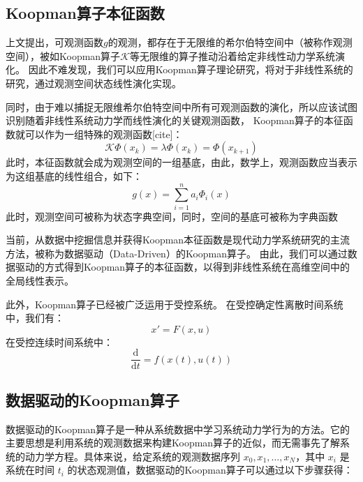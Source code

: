 \documentclass[AutoFakeBold]{LZUThesis}
\begin{document}

\subsection{Koopman算子本征函数}
上文提出，可观测函数$g$的观测，都存在于无限维的希尔伯特空间中（被称作观测空间），被如Koopman算子$\mathcal{K}$等无限维的算子推动沿着给定非线性动力学系统演化。
因此不难发现，我们可以应用Koopman算子理论研究，将对于非线性系统的研究，通过观测空间状态线性演化实现。

同时，由于难以捕捉无限维希尔伯特空间中所有可观测函数的演化，所以应该试图识别随着非线性系统动力学而线性演化的关键观测函数，
Koopman算子的本征函数就可以作为一组特殊的观测函数[cite]：
\begin{equation}
  \mathcal{K} \Phi (x_k) = \lambda \Phi(x_k) = \Phi(x_{k + 1})
\end{equation}
此时，本征函数就会成为观测空间的一组基底，由此，数学上，观测函数应当表示为这组基底的线性组合，如下：
\begin{equation}
  g(x) = \sum_{i = 1}^n a_i \Phi_i(x)
\end{equation}
此时，观测空间可被称为状态字典空间，同时，空间的基底可被称为字典函数

当前，从数据中挖掘信息并获得Koopman本征函数是现代动力学系统研究的主流方法，被称为数据驱动（Data-Driven）的Koopman算子。
由此，我们可以通过数据驱动的方式得到Koopman算子的本征函数，以得到非线性系统在高维空间中的全局线性表示。

此外，Koopman算子已经被广泛运用于受控系统。
在受控确定性离散时间系统中，我们有：
\begin{equation}
  x' = F(x, u)
\end{equation}
在受控连续时间系统中：
\begin{equation}
  \frac{\mathrm{d}}{\mathrm{d}t} = f(x(t), u(t))
\end{equation}

\subsection{数据驱动的Koopman算子}

数据驱动的Koopman算子是一种从系统数据中学习系统动力学行为的方法。它的主要思想是利用系统的观测数据来构建Koopman算子的近似，而无需事先了解系统的动力学方程。具体来说，给定系统的观测数据序列 ${x_0, x_1, \dots, x_N}$，其中 $x_i$ 是系统在时间 $t_i$ 的状态观测值，数据驱动的Koopman算子可以通过以下步骤获得：
\end{document}
